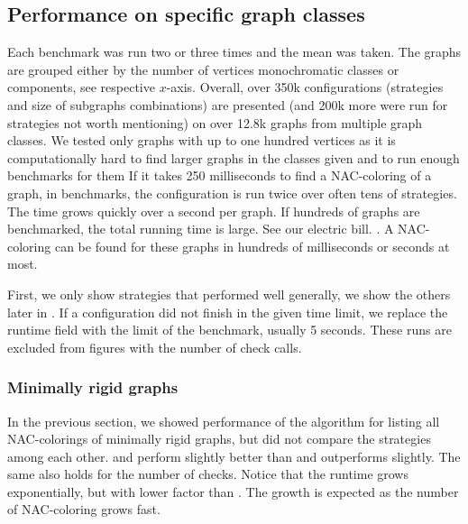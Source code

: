 \subsection{Performance on specific graph classes}%
\label{sec:bench_graph_classes}


Each benchmark was run two or three times and the mean was taken.
The graphs are grouped either by the number of vertices
monochromatic classes or \trcon{} components, see respective \(x\)-axis.
Overall, over 350k configurations (strategies and size of subgraphs combinations)
are presented (and 200k more were run for strategies not worth mentioning)
on over 12.8k graphs from multiple graph classes.
%
We tested only graphs with up to one hundred vertices
as it is computationally hard to find larger graphs in the classes given
and to run enough benchmarks for them
{
	If it takes 250 milliseconds to find a NAC-coloring of a graph,
	in benchmarks, the configuration is run twice over often tens of strategies.
	The time grows quickly over a second per graph.
	If hundreds of graphs are benchmarked,
	the total running time is large.
	See our electric bill.
}.
A NAC-coloring can be found for these graphs in hundreds of milliseconds or seconds at most.

First, we only show strategies that performed well generally,
we show the others later in .
If a configuration did not finish in the given time limit,
we replace the runtime field with the limit of the benchmark, usually 5 seconds.
These runs are excluded from figures with the number of check calls.


\subsubsection*{Minimally rigid graphs}

In the previous section, we showed performance of the algorithm for listing
all NAC-colorings of minimally rigid graphs,
but did not compare the strategies among each other.
%
\Neighbors{} and \NeighborsDegree{} perform slightly better than \None{} and
\SharedVertices{} outperforms \MergeLinear{} slightly.
The same also holds for the number of \IsNACColoring{} checks.
Notice that the runtime grows exponentially, but with lower factor than \NaiveCycles{}.
The growth is expected as the number of NAC-coloring grows fast.

